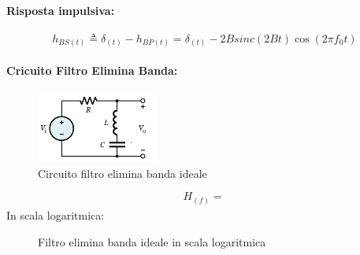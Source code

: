             \paragraph{Risposta impulsiva:}
            \[
                h_{BS(t)}\triangleq \delta_{(t)} - h_{BP(t)} = \delta_{(t)} - 2Bsinc(2Bt) \cos(2\pi f_0t)
            \]

            \paragraph{Cricuito Filtro Elimina Banda:}
                \begin{figure}[H]
                    \centering
                    \includegraphics[width=4cm]{media/Band-Reject_Filter.png}
                    \caption{Circuito filtro elimina banda ideale}
                    \label{fig:circuito filtro elimina banda ideale}
                \end{figure}
                \[
                    H_{(f)} = \frac{}{}  
                \]
            In scala logaritmica:
            \begin{figure}[H]
                \centering
                \caption{Filtro elimina banda ideale in scala logaritmica}
                \label{fig:BS filter logartithm}
            \end{figure}
